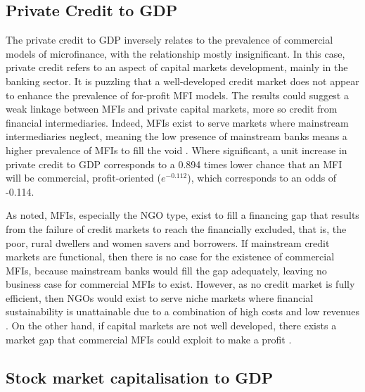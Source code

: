 \documentclass[a4paper,nobind]{templates/ociamthesis}
\begin{document}
\hypertarget{private-credit-to-gdp}{%
\subsection{Private Credit to GDP}\label{private-credit-to-gdp}}

The private credit to GDP inversely relates to the prevalence of commercial models of microfinance, with the relationship mostly insignificant. In this case, private credit refers to an aspect of capital markets development, mainly in the banking sector. It is puzzling that a well-developed credit market does not appear to enhance the prevalence of for-profit MFI models. The results could suggest a weak linkage between MFIs and private capital markets, more so credit from financial intermediaries. Indeed, MFIs exist to serve markets where mainstream intermediaries neglect, meaning the low presence of mainstream banks means a higher prevalence of MFIs to fill the void \autocite{de2007economics}. Where significant, a unit increase in private credit to GDP corresponds to a 0.894 times lower chance that an MFI will be commercial, profit-oriented (\(e^{-0.112}\)), which corresponds to an odds of -0.114.

As noted, MFIs, especially the NGO type, exist to fill a financing gap that results from the failure of credit markets to reach the financially excluded, that is, the poor, rural dwellers and women savers and borrowers. If mainstream credit markets are functional, then there is no case for the existence of commercial MFIs, because mainstream banks would fill the gap adequately, leaving no business case for commercial MFIs to exist. However, as no credit market is fully efficient, then NGOs would exist to serve niche markets where financial sustainability is unattainable due to a combination of high costs and low revenues \autocite{de2007economics}. On the other hand, if capital markets are not well developed, there exists a market gap that commercial MFIs could exploit to make a profit \autocite{d2013unsubsidized,armendariz2013subsidy}.

\hypertarget{stock-market-capitalisation-to-gdp}{%
\subsection{Stock market capitalisation to GDP}\label{stock-market-capitalisation-to-gdp}}
\end{document}
